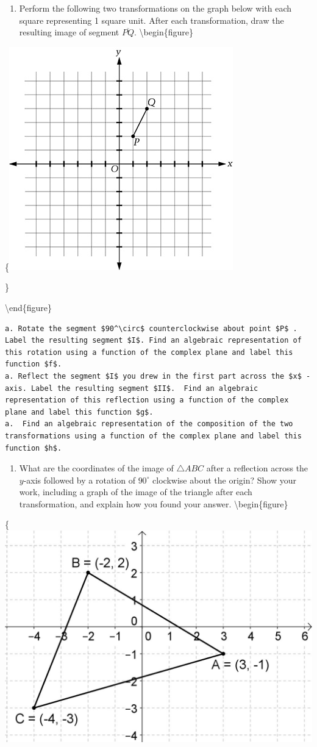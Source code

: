 \documentclass[
]{book}
\providecommand{\tightlist}{%
  \setlength{\itemsep}{0pt}\setlength{\parskip}{0pt}}
\theoremstyle{definition}
\theoremstyle{definition}
\theoremstyle{definition}
\theoremstyle{definition}
\theoremstyle{remark}
\begin{document}
\begin{enumerate}
\def\labelenumi{\arabic{enumi}.}
\tightlist
\item
  Perform the following two transformations on the graph below with each square representing 1 square unit. After each transformation, draw the resulting image of segment \(\overline{PQ}\).
  \textbackslash begin\{figure\}
\end{enumerate}

\{\centering \includegraphics[width=0.35\linewidth]{images/transformgraph}

\}

\textbackslash end\{figure\}

\begin{verbatim}
a. Rotate the segment $90^\circ$ counterclockwise about point $P$ . Label the resulting segment $I$. Find an algebraic representation of this rotation using a function of the complex plane and label this function $f$.
a. Reflect the segment $I$ you drew in the first part across the $x$ -axis. Label the resulting segment $II$.  Find an algebraic representation of this reflection using a function of the complex plane and label this function $g$.
a.  Find an algebraic representation of the composition of the two transformations using a function of the complex plane and label this function $h$.
\end{verbatim}

\begin{enumerate}
\def\labelenumi{\arabic{enumi}.}
\tightlist
\item
  What are the coordinates of the image of \(\triangle ABC\) after a reflection across the \(y\)-axis followed by a rotation of \(90^\circ\) clockwise about the origin? Show your work, including a graph of the image of the triangle after each transformation, and explain how you found your answer.
  \textbackslash begin\{figure\}
\end{enumerate}

\{\centering \includegraphics[width=0.35\linewidth]{images/Transformation_Triangle2}
\end{document}
